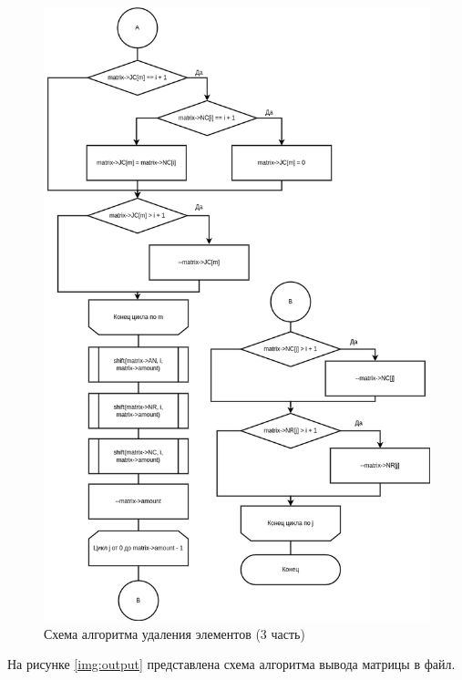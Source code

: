 \begin{figure}[H]
	\begin{center}
		\includegraphics[scale=0.51]{img/deletion3.png}
	\end{center}
	\captionsetup{justification=centering}
	\caption{Схема алгоритма удаления элементов (3 часть)}
	\label{img:deletion3}
\end{figure}

На рисунке \ref{img:output} представлена схема алгоритма вывода матрицы в файл.


